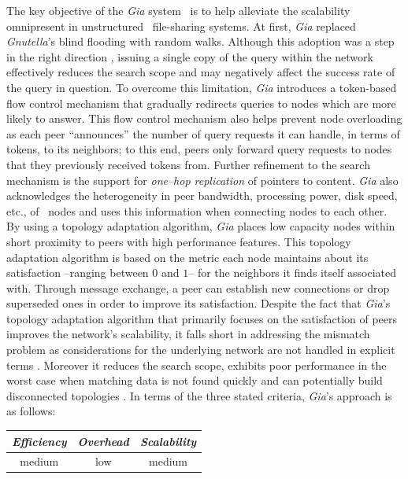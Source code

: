 The key objective of the {\sl Gia} system~\cite{CRBLS2003} is 
to help alleviate the scalability omnipresent
in unstructured \p\ file-sharing systems.
At first, {\sl Gia} replaced {\sl Gnutella}'s blind flooding 
with random walks.
Although this adoption was 
a step in the right direction \cite{LCCLS2002},
issuing a single copy of the query within the network
effectively reduces the search scope and may negatively affect 
the success rate of the query in question.
To overcome this limitation, {\sl Gia} introduces
a token-based flow control mechanism 
that gradually redirects queries to nodes which are more
likely to answer. This flow control mechanism also helps prevent node
overloading as each peer ``announces'' the number of query requests it 
can handle, in terms of tokens, to its neighbors; to this end, 
peers only forward query requests to nodes that they previously
received tokens from. Further refinement to the search mechanism is the
support for \emph{one--hop replication} of pointers to content.
{\sl Gia} also acknowledges the heterogeneity in peer bandwidth,
processing power, disk speed, etc., of \p\ nodes and uses this
information when connecting nodes to each other.
By using a topology adaptation algorithm, 
{\sl Gia} places low capacity nodes within 
short proximity to peers with high performance features.
This topology adaptation algorithm is based on the metric 
each node maintains about its satisfaction --ranging between $0$ and $1$--
for the neighbors it finds itself associated with. 
Through message exchange, a peer can establish new connections 
or drop superseded ones in order to improve its satisfaction.
Despite the fact that {\sl Gia}'s topology adaptation algorithm 
that primarily focuses on the satisfaction of peers improves the network's
scalability, it falls short in addressing the mismatch problem
as considerations for the underlying network are not handled in explicit
terms \cite{LXLNZ2005}. Moreover it reduces the search scope, exhibits poor
performance in the worst case when matching data is not found quickly
\cite{PR2004,HJ2004} and can potentially build  disconnected topologies
\cite{MBL2006}.
%
In terms of the three stated criteria, {\sl Gia}'s approach is as follows:
\begin{center}
{\footnotesize
\begin{tabular}{ccc}
\emph{Efficiency} & \emph{Overhead} & \emph{Scalability} \\
\hline
medium &
low &
medium
\end{tabular}
}
\end{center}

